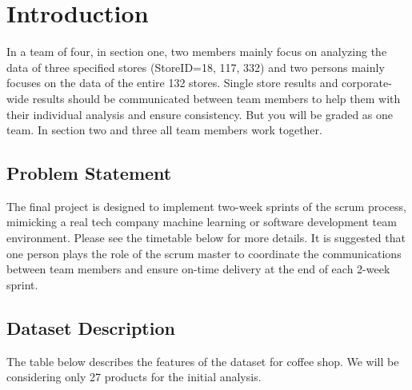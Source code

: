 \section{Introduction}
In a team of four, in section one, two members mainly focus on analyzing the data of three specified stores (StoreID=18, 117, 332) and two persons mainly focuses on the data of the entire 132 stores. Single store results and corporate-wide results should be communicated between team members to help them with their individual analysis and ensure consistency. But you will be graded as one team. In section two and three all team members work together.
\subsection{Problem Statement}
The final project is designed to implement two-week sprints of the scrum process, mimicking a real tech company machine learning or software development team environment. Please see the timetable below for more details. It is suggested that one person plays the role of the scrum master to coordinate the communications between team members and ensure on-time delivery at the end of each 2-week sprint.

\subsection{Dataset Description}
The table below describes the features of the dataset for coffee shop. We will be considering only 27 products for the initial analysis. 

